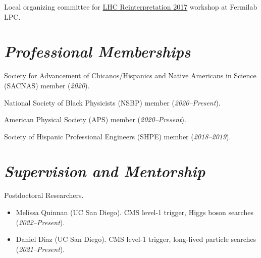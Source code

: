 \documentclass[11pt]{res}
\newcommand{\MarginText}[1]{\section{\textit{#1}}}
\begin{document}
\begin{resume}
{    Local organizing committee for \href{https://indico.cern.ch/event/639314/}{LHC Reinterpretation 2017} workshop at Fermilab LPC.

    \MarginText{Professional Memberships}

    Society for Advancement of Chicanos/Hispanics and Native Americans in Science (SACNAS) member (\textit{2020}).

    National Society of Black Physicists (NSBP) member (\textit{2020--Present}).

    American Physical Society (APS) member (\textit{2020--Present}).

    Society of Hispanic Professional Engineers (SHPE) member (\textit{2018--2019}).

  }{}


  \MarginText{Supervision and Mentorship}

  Postdoctoral Researchers.
  \begin{itemize}
    \itemsep-0.3em
    \item Melissa Quinnan (UC San Diego). CMS level-1 trigger, Higgs boson searches (\textit{2022--Present}).
    \item Daniel Diaz (UC San Diego). CMS level-1 trigger, long-lived particle searches (\textit{2021--Present}).
  \end{itemize}


\end{resume}
\end{document}
